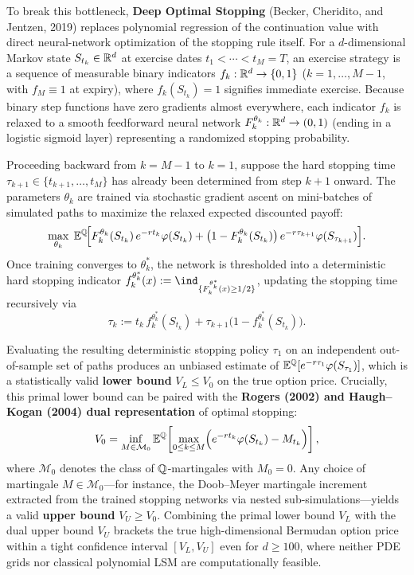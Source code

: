 To break this bottleneck, \textbf{Deep Optimal Stopping} (Becker, Cheridito, and Jentzen, 2019) replaces polynomial regression of the continuation value with direct neural-network optimization of the stopping rule itself. For a $d$-dimensional Markov state $S_{t_k} \in \mathbb{R}^d$ at exercise dates $t_1 < \cdots < t_M = T$, an exercise strategy is a sequence of measurable binary indicators $f_k : \mathbb{R}^d \to \{0, 1\}$ ($k = 1, \ldots, M - 1$, with $f_M \equiv 1$ at expiry), where $f_k(S_{t_k}) = 1$ signifies immediate exercise. Because binary step functions have zero gradients almost everywhere, each indicator $f_k$ is relaxed to a smooth feedforward neural network $F_k^{\theta_k} : \mathbb{R}^d \to (0, 1)$ (ending in a logistic sigmoid layer) representing a randomized stopping probability.

Proceeding backward from $k = M - 1$ to $k = 1$, suppose the hard stopping time $\tau_{k+1} \in \{t_{k+1}, \ldots, t_M\}$ has already been determined from step $k + 1$ onward. The parameters $\theta_k$ are trained via stochastic gradient ascent on mini-batches of simulated paths to maximize the relaxed expected discounted payoff:
\begin{equation}\label{eq:deep-optimal-stopping}
    \max_{\theta_k}\; \mathbb{E}^{\mathbb{Q}}\!\Bigl[F_k^{\theta_k}(S_{t_k})\, e^{-rt_k}\varphi(S_{t_k}) + \bigl(1 - F_k^{\theta_k}(S_{t_k})\bigr)\, e^{-r\tau_{k+1}}\varphi(S_{\tau_{k+1}})\Bigr].
\end{equation}
Once training converges to $\theta_k^*$, the network is thresholded into a deterministic hard stopping indicator $f_k^{\theta_k^*}(x) := \ind_{\{F_k^{\theta_k^*}(x) \ge 1/2\}}$, updating the stopping time recursively via
\[
\tau_k := t_k\, f_k^{\theta_k^*}(S_{t_k}) + \tau_{k+1}\bigl(1 - f_k^{\theta_k^*}(S_{t_k})\bigr).
\]

Evaluating the resulting deterministic stopping policy $\tau_1$ on an independent out-of-sample set of paths produces an unbiased estimate of $\mathbb{E}^{\mathbb{Q}}[e^{-r\tau_1}\varphi(S_{\tau_1})]$, which is a statistically valid \textbf{lower bound} $V_L \le V_0$ on the true option price. Crucially, this primal lower bound can be paired with the \textbf{Rogers (2002) and Haugh--Kogan (2004) dual representation} of optimal stopping:
\begin{equation}\label{eq:rogers-dual}
    V_0 = \inf_{M \in \mathcal{M}_0} \mathbb{E}^{\mathbb{Q}}\!\left[\max_{0 \le k \le M} \Bigl(e^{-rt_k}\varphi(S_{t_k}) - M_{t_k}\Bigr)\right],
\end{equation}
where $\mathcal{M}_0$ denotes the class of $\mathbb{Q}$-martingales with $M_0 = 0$. Any choice of martingale $M \in \mathcal{M}_0$---for instance, the Doob--Meyer martingale increment extracted from the trained stopping networks via nested sub-simulations---yields a valid \textbf{upper bound} $V_U \ge V_0$. Combining the primal lower bound $V_L$ with the dual upper bound $V_U$ brackets the true high-dimensional Bermudan option price within a tight confidence interval $[V_L, V_U]$ even for $d \ge 100$, where neither PDE grids nor classical polynomial LSM are computationally feasible.
